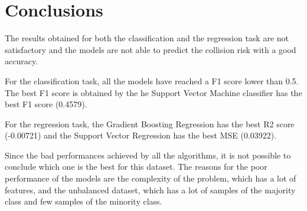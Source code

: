 \section{Conclusions}
The results obtained for both the classification and the regression task are not satisfactory and the models are not able to predict the collision risk with a good accuracy.

For the classification task, all the models have reached a F1 score lower than 0.5. The best F1 score is obtained by the he Support Vector Machine classifier has the best F1 score (0.4579).

For the regression task, the Gradient Boosting Regression has the best R2 score (-0.00721) and the Support Vector Regression has the best MSE (0.03922).

Since the bad performances achieved by all the algorithms, it is not possible to conclude which one is the best for this dataset.
The reasons for the poor performance of the models are the complexity of the problem, which has a lot of features, and the unbalanced dataset, which has a lot of samples of the majority class and few samples of the minority class.